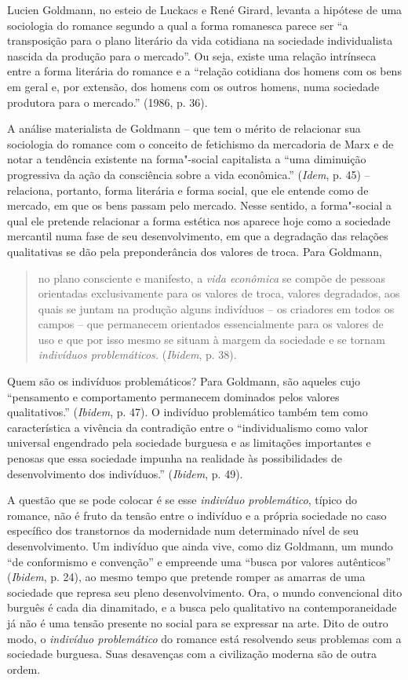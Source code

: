 Lucien Goldmann, no esteio de Luckacs e René Girard, levanta a hipótese
de uma sociologia do romance segundo a qual a forma romanesca parece ser
``a transposição para o plano literário da vida cotidiana na sociedade
individualista nascida da produção para o mercado''. Ou seja, existe uma
relação intrínseca entre a forma literária do romance e a ``relação
cotidiana dos homens com os bens em geral e, por extensão, dos homens
com os outros homens, numa sociedade produtora para o mercado.'' (1986,
p. 36).

A análise materialista de Goldmann -- que tem o mérito de relacionar sua
sociologia do romance com o conceito de fetichismo da mercadoria de Marx
e de notar a tendência existente na forma"-social capitalista a ``uma
diminuição progressiva da ação da consciência sobre a vida econômica.''
(\emph{Idem}, p. 45) -- relaciona, portanto, forma literária e forma
social, que ele entende como de mercado, em que os bens passam pelo
mercado. Nesse sentido, a forma"-social a qual ele pretende relacionar a
forma estética nos aparece hoje como a sociedade mercantil numa fase de
seu desenvolvimento, em que a degradação das relações qualitativas se
dão pela preponderância dos valores de troca. Para Goldmann,

\begin{quote}
no plano consciente e manifesto, a \emph{vida econômica} se compõe de
pessoas orientadas exclusivamente para os valores de troca, valores
degradados, aos quais se juntam na produção alguns indivíduos -- os
criadores em todos os campos -- que permanecem orientados essencialmente
para os valores de uso e que por isso mesmo se situam à margem da
sociedade e se tornam \emph{indivíduos problemáticos.} (\emph{Ibidem},
p. 38).
\end{quote}

Quem são os indivíduos problemáticos? Para Goldmann, são aqueles cujo
``pensamento e comportamento permanecem dominados pelos valores
qualitativos.'' (\emph{Ibidem}, p. 47). O indivíduo problemático também
tem como característica a vivência da contradição entre o
``individualismo como valor universal engendrado pela sociedade burguesa
e as limitações importantes e penosas que essa sociedade impunha na
realidade às possibilidades de desenvolvimento dos indivíduos.''
(\emph{Ibidem}, p. 49).

A questão que se pode colocar é se esse \emph{indivíduo problemático},
típico do romance, não é fruto da tensão entre o indivíduo e a própria
sociedade no caso específico dos transtornos da modernidade num
determinado nível de seu desenvolvimento. Um indivíduo que ainda vive,
como diz Goldmann, um mundo ``de conformismo e convenção'' e empreende
uma ``busca por valores autênticos'' (\emph{Ibidem}, p. 24), ao mesmo
tempo que pretende romper as amarras de uma sociedade que represa seu
pleno desenvolvimento. Ora, o mundo convencional dito burguês é cada dia
dinamitado, e a busca pelo qualitativo na contemporaneidade já não é uma
tensão presente no social para se expressar na arte. Dito de outro modo,
o \emph{indivíduo problemático} do romance está resolvendo seus
problemas com a sociedade burguesa. Suas desavenças com a civilização moderna são de outra ordem.

